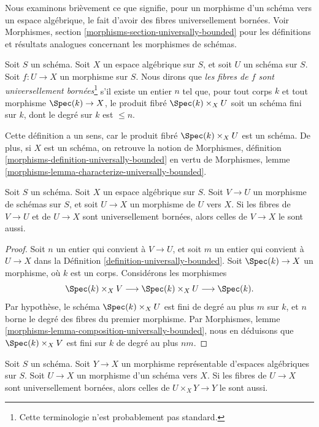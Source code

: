 \noindent
Nous examinons brièvement ce que signifie, pour un morphisme d'un schéma vers
un espace algébrique, le fait d'avoir des fibres universellement bornées. Voir
Morphismes, section \ref{morphisms-section-universally-bounded}
pour les définitions et résultats analogues concernant les morphismes de
schémas.

\begin{definition}
\label{definition-universally-bounded}
Soit $S$ un schéma. Soit $X$ un espace algébrique sur $S$, et soit
$U$ un schéma sur $S$. Soit $f : U \to X$ un morphisme sur $S$.
Nous dirons que {\it les fibres de $f$ sont universellement
bornées}\footnote{Cette terminologie n'est probablement pas standard.}
s'il existe un entier $n$ tel que, pour tout corps $k$ et tout morphisme
$\Spec(k) \to X$, le produit fibré $\Spec(k) \times_X U$ soit un schéma fini
sur $k$, dont le degré sur $k$ est $\leq n$.
\end{definition}

\noindent
Cette définition a un sens, car le produit fibré
$\Spec(k) \times_X U$ est un schéma. De plus, si $X$ est un schéma,
on retrouve la notion de
Morphismes, définition \ref{morphisms-definition-universally-bounded}
en vertu de
Morphismes, lemme \ref{morphisms-lemma-characterize-universally-bounded}.

\begin{lemma}
\label{lemma-composition-universally-bounded}
Soit $S$ un schéma. Soit $X$ un espace algébrique sur $S$.
Soit $V \to U$ un morphisme de schémas sur $S$, et soit
$U \to X$ un morphisme de $U$ vers $X$. Si les fibres de
$V \to U$ et de $U \to X$ sont universellement bornées, alors celles de
$V \to X$ le sont aussi.
\end{lemma}

\begin{proof}
Soit $n$ un entier qui convient à $V \to U$, et soit $m$ un entier qui
convient à $U \to X$ dans la
Définition \ref{definition-universally-bounded}.
Soit $\Spec(k) \to X$ un morphisme, où $k$ est un corps.
Considérons les morphismes
$$
\Spec(k) \times_X V
\longrightarrow
\Spec(k) \times_X U
\longrightarrow
\Spec(k).
$$
Par hypothèse, le schéma $\Spec(k) \times_X U$ est fini de degré au plus $m$
sur $k$, et $n$ borne le degré des fibres du premier morphisme. Par
Morphismes, lemme \ref{morphisms-lemma-composition-universally-bounded},
nous en déduisons que $\Spec(k) \times_X V$ est fini sur $k$ de degré au plus
$nm$.
\end{proof}

\begin{lemma}
\label{lemma-base-change-universally-bounded}
Soit $S$ un schéma.
Soit $Y \to X$ un morphisme représentable d'espaces algébriques sur $S$.
Soit $U \to X$ un morphisme d'un schéma vers $X$.
Si les fibres de $U \to X$ sont universellement bornées, alors celles de
$U \times_X Y \to Y$ le sont aussi.
\end{lemma}

